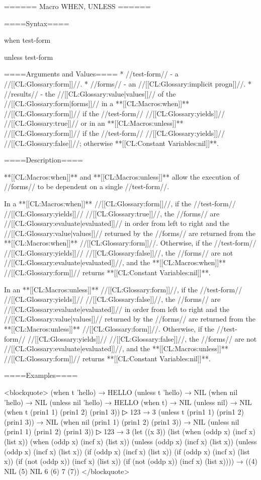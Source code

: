====== Macro WHEN, UNLESS ======

====Syntax====

\DefmacWithValues when {test-form } {}

\DefmacWithValues unless {test-form } {}

====Arguments and Values====
  * //test-form// - a //[[CL:Glossary:form]]//.
  * //forms// - an //[[CL:Glossary:implicit progn]]//.
  * //results// - the //[[CL:Glossary:value|values]]// of the //[[CL:Glossary:form|forms]]// in a **[[CL:Macros:when]]** //[[CL:Glossary:form]]// if the //test-form// //[[CL:Glossary:yields]]// //[[CL:Glossary:true]]// or in an **[[CL:Macros:unless]]** //[[CL:Glossary:form]]// if the //test-form// //[[CL:Glossary:yields]]// //[[CL:Glossary:false]]//; otherwise **[[CL:Constant Variables:nil]]**.

====Description====

**[[CL:Macros:when]]** and **[[CL:Macros:unless]]** allow the execution of //forms// to be dependent on a single //test-form//.

In a **[[CL:Macros:when]]** //[[CL:Glossary:form]]//, if the //test-form// //[[CL:Glossary:yields]]// //[[CL:Glossary:true]]//, the //forms// are //[[CL:Glossary:evaluate|evaluated]]// in order from left to right and the //[[CL:Glossary:value|values]]// returned by the //forms// are returned from the **[[CL:Macros:when]]** //[[CL:Glossary:form]]//. Otherwise, if the //test-form// //[[CL:Glossary:yields]]// //[[CL:Glossary:false]]//, the //forms// are not //[[CL:Glossary:evaluate|evaluated]]//, and the **[[CL:Macros:when]]** //[[CL:Glossary:form]]// returns **[[CL:Constant Variables:nil]]**.

In an **[[CL:Macros:unless]]** //[[CL:Glossary:form]]//, if the //test-form// //[[CL:Glossary:yields]]// //[[CL:Glossary:false]]//, the //forms// are //[[CL:Glossary:evaluate|evaluated]]// in order from left to right and the //[[CL:Glossary:value|values]]// returned by the //forms// are returned from the **[[CL:Macros:unless]]** //[[CL:Glossary:form]]//. Otherwise, if the //test-form// //[[CL:Glossary:yields]]// //[[CL:Glossary:false]]//, the //forms// are not //[[CL:Glossary:evaluate|evaluated]]//, and the **[[CL:Macros:unless]]** //[[CL:Glossary:form]]// returns **[[CL:Constant Variables:nil]]**.

====Examples====

<blockquote> (when t 'hello) → HELLO (unless t 'hello) → NIL (when nil 'hello) → NIL (unless nil 'hello) → HELLO (when t) → NIL (unless nil) → NIL (when t (prin1 1) (prin1 2) (prin1 3))
▷ 123 → 3 (unless t (prin1 1) (prin1 2) (prin1 3)) → NIL (when nil (prin1 1) (prin1 2) (prin1 3)) → NIL (unless nil (prin1 1) (prin1 2) (prin1 3))
▷ 123 → 3 (let ((x 3)) (list (when (oddp x) (incf x) (list x)) (when (oddp x) (incf x) (list x)) (unless (oddp x) (incf x) (list x)) (unless (oddp x) (incf x) (list x)) (if (oddp x) (incf x) (list x)) (if (oddp x) (incf x) (list x)) (if (not (oddp x)) (incf x) (list x)) (if (not (oddp x)) (incf x) (list x)))) → ((4) NIL (5) NIL 6 (6) 7 (7)) </blockquote>

